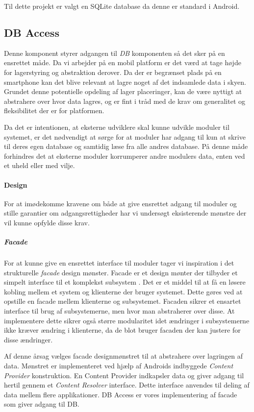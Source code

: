 Til dette projekt er valgt en SQLite database da denne er standard i Android.\cite{android_database}


\subsection{DB Access}
Denne komponent styrer adgangen til \textit{DB} komponenten så det sker på en ensrettet måde.
Da vi arbejder på en mobil platform er det værd at tage højde for lagerstyring og abstraktion derover.
Da der er begrænset plads på en smartphone kan det blive relevant at lagre noget af det indsamlede data i skyen.
Grundet denne potentielle opdeling af lager placeringer, kan de være nyttigt at abstrahere over hvor data lagres, og er fint i tråd med de krav om generalitet og fleksibilitet der er for platformen.

Da det er intentionen, at eksterne udviklere skal kunne udvikle moduler til systemet, er det nødvendigt at sørge for at moduler har adgang til kun at skrive til deres egen database og samtidig læse fra alle andres database.
På denne måde forhindres det at eksterne moduler korrumperer andre modulers data, enten ved et uheld eller med vilje.

\paragraph{Design} 
For at imødekomme kravene om både at give ensrettet adgang til moduler og stille garantier om adgangsrettigheder har vi undersøgt eksisterende mønstre der vil kunne opfylde disse krav.

\subparagraph{Facade}
For at kunne give en ensrettet interface til moduler tager vi inspiration i det strukturelle \textit{facade} design mønster.
Facade er et design mønter der tilbyder et simpelt interface til et komplekst subsystem \citep{gamma1994design}. 
Det er et middel til at få en løsere kobling mellem et system og klienterne der bruger systemet.
Dette gøres ved at opstille en facade mellem klienterne og subsystemet.
Facaden sikrer et ensartet interface til brug af subsystemerne, men hvor man abstraherer over disse.
At implementere dette sikrer også større modularitet idet ændringer i subsystemerne ikke kræver ændring i klienterne, da de blot bruger facaden der kan justere for disse ændringer.

Af denne årsag vælges facade designmønstret til at abstrahere over lagringen af data.
Mønstret er implementeret ved hjælp af Androids indbyggede \textit{Content Provider} konstruktion\citep{contentprovider}.
En Content Provider indkapsler data og giver adgang til hertil gennem et \textit{Content Resolver} interface.
Dette interface anvendes til deling af data mellem flere applikationer.
DB Access er vores implementering af facade som giver adgang til DB.

